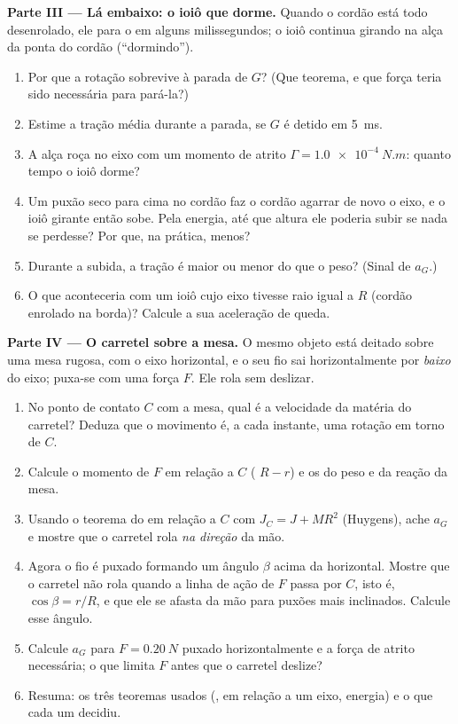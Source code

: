 \begin{problem}
\medskip
\noindent\textbf{Parte III --- Lá embaixo: o ioiô que dorme.}
Quando o cordão está todo desenrolado, ele para o  em alguns
milissegundos; o ioiô continua girando na alça da ponta do cordão
(``dormindo'').
\begin{enumerate}[resume]
  \item Por que a rotação sobrevive à parada de $G$? (Que teorema, e que
        força teria sido necessária para pará-la?)
  \item Estime a tração média durante a parada, se $G$ é detido em
        \qty{5}{ms}.
  \item A alça roça no eixo com um momento de atrito $\Gamma =
        \qty{1.0e-4}{N.m}$: quanto tempo o ioiô dorme?
  \item Um puxão seco para cima no cordão faz o cordão agarrar de novo o
        eixo, e o ioiô girante então sobe. Pela energia, até que altura ele
        poderia subir se nada se perdesse? Por que, na prática, menos?
  \item Durante a subida, a tração é maior ou menor do que o peso? (Sinal
        de $a_G$.)
  \item O que aconteceria com um ioiô cujo eixo tivesse raio igual a $R$
        (cordão enrolado na borda)? Calcule a sua aceleração de queda.
\end{enumerate}

\medskip
\noindent\textbf{Parte IV --- O carretel sobre a mesa.}
O mesmo objeto está deitado sobre uma mesa rugosa, com o eixo horizontal, e
o seu fio sai horizontalmente por \emph{baixo} do eixo; puxa-se com uma
força $F$. Ele rola sem deslizar.
\begin{enumerate}[resume]
  \item No ponto de contato $C$ com a mesa, qual é a velocidade da matéria
        do carretel? Deduza que o movimento é, a cada instante, uma
        rotação em torno de $C$.
  \item Calcule o momento de $F$ em relação a $C$ ( $R - r$)
        e os do peso e da reação da mesa.
  \item Usando o teorema do  em relação a $C$ com $J_C = J +
        MR^2$ (Huygens), ache $a_G$ e mostre que o carretel rola
        \emph{na direção} da mão.
  \item Agora o fio é puxado formando um ângulo $\beta$ acima da
        horizontal. Mostre que o carretel não rola quando a linha de ação
        de $F$ passa por $C$, isto é, $\cos\beta = r/R$, e que ele se
        afasta da mão para puxões mais inclinados. Calcule esse ângulo.
  \item Calcule $a_G$ para $F = \qty{0.20}{N}$ puxado horizontalmente e a
        força de atrito necessária; o que limita $F$ antes que o carretel
        deslize?
  \item Resuma: os três teoremas usados (, 
        em relação a um eixo, energia) e o que cada um decidiu.
\end{enumerate}
\end{problem}
